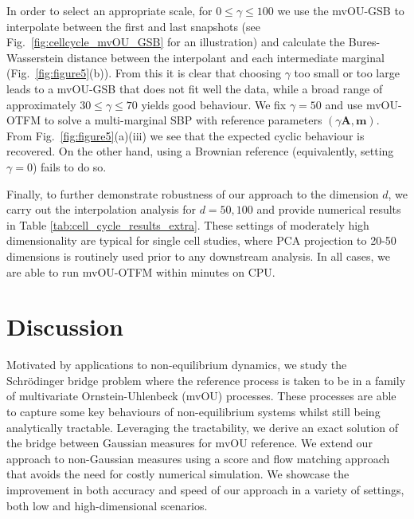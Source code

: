 \documentclass{article}
\theoremstyle{newstyle}
\begin{document}
In order to select an appropriate scale, for $0 \leq \gamma \leq 100$ we use the mvOU-GSB to interpolate between the first and last snapshots (see Fig.~\ref{fig:cellcycle_mvOU_GSB} for an illustration) and calculate the Bures-Wasserstein distance between the interpolant and each intermediate marginal (Fig.~\ref{fig:figure5}(b)). From this it is clear that choosing $\gamma$ too small or too large leads to a mvOU-GSB that does not fit well the data, while a broad range of approximately $30 \leq \gamma \leq 70$ yields good behaviour. We fix $\gamma = 50$ and use mvOU-OTFM to solve a multi-marginal SBP with reference parameters $(\gamma \bm{A}, \bm{m})$. From Fig.~\ref{fig:figure5}(a)(iii) we see that the expected cyclic behaviour is recovered. On the other hand, using a Brownian reference (equivalently, setting $\gamma = 0$) fails to do so.

Finally, to further demonstrate robustness of our approach to the dimension $d$, we carry out the interpolation analysis for $d = 50, 100$ and provide numerical results in Table \ref{tab:cell_cycle_results_extra}. These settings of moderately high dimensionality are typical for single cell studies, where PCA projection to 20-50 dimensions is routinely used prior to any downstream analysis. In all cases, we are able to run mvOU-OTFM within minutes on CPU.

\section{Discussion}

Motivated by applications to non-equilibrium dynamics, we study the Schr\"odinger bridge problem where the reference process is taken to be in a family of multivariate Ornstein-Uhlenbeck (mvOU) processes. These processes are able to capture some key behaviours of non-equilibrium systems whilst still being analytically tractable. Leveraging the tractability, we derive an exact solution of the bridge between Gaussian measures for mvOU reference. We extend our approach to non-Gaussian measures using a score and flow matching approach that avoids the need for costly numerical simulation. We showcase the improvement in both accuracy and speed of our approach in a variety of settings, both low and high-dimensional scenarios.
\end{document}
